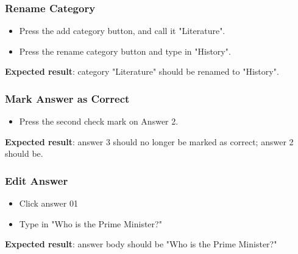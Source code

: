 \subsubsection{Rename Category}
\begin{itemize}
\item Press the add category button, and call it "Literature".
\item Press the rename category button and type in "History".
\end{itemize}
\textbf{Expected result}: category "Literature" should be renamed to "History".

\subsubsection{Mark Answer as Correct}
\begin{itemize}
\item Press the second check mark on Answer 2.
\end{itemize}
\textbf{Expected result}: answer 3 should no longer be marked as correct; answer 2 should be.

\subsubsection{Edit Answer}
\begin{itemize}
\item Click answer 01
\item Type in "Who is the Prime Minister?"
\end{itemize}
\textbf{Expected result}: answer body should be "Who is the Prime Minister?"

